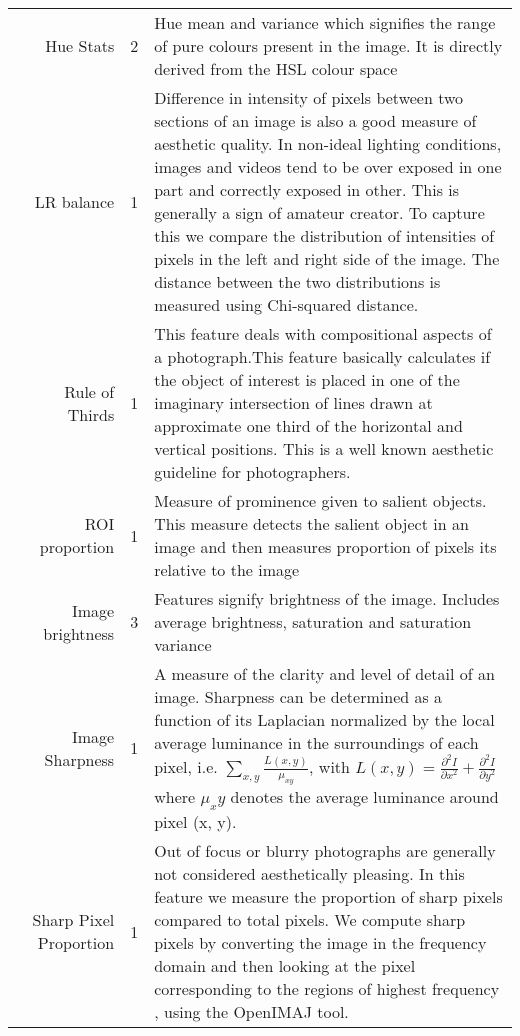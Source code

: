 \begin{appendix}
\begin{table}[hp]
{\begin{tabular}{|c|r|c|p{17cm}|}
		& Hue Stats & 2 & Hue mean and variance which signifies the range of pure colours present in the image. It is directly derived from the HSL colour space \\ %
		& LR balance &1 & Difference in intensity of pixels between two sections of an image is also a good measure of aesthetic quality. In non-ideal lighting conditions, images and videos tend to be over exposed in one part and correctly exposed in other. This is generally a sign of amateur creator. To capture this we compare the distribution of intensities of pixels in the left and right side of the image. The distance between the two distributions is measured using Chi-squared distance.\\
		& Rule of Thirds & 1 & This feature deals with compositional aspects of a photograph.This feature basically calculates if the object of interest is placed in one of the imaginary intersection of lines drawn at approximate one third of the horizontal and vertical positions. This is a well known aesthetic guideline for photographers. \\
		& ROI proportion & 1 & Measure of prominence given to salient objects. This measure detects the salient object in an image and then measures proportion of pixels its relative to the image \\
		& Image brightness & 3 & Features signify brightness of the image. Includes average brightness, saturation  and saturation variance\\
		& Image Sharpness & 1 & A measure of the clarity and level of detail of an image. Sharpness can be determined as a function of its Laplacian normalized by the local average luminance in the surroundings of each pixel, i.e. $\sum_{x, y} \frac{L(x, y)}{\mu_{xy}}$, with $L(x, y) = \frac{\partial^2I}{\partial x^2}+\frac{\partial^2I}{\partial y^2}$ where $\mu_xy$ denotes the average luminance around pixel (x, y).\\
		& Sharp Pixel Proportion  & 1 & Out of focus or blurry photographs are generally not considered aesthetically pleasing. In this feature we measure the proportion of sharp pixels compared to total pixels. We compute sharp pixels by converting the image in the frequency domain and then looking at the pixel corresponding to the regions of highest frequency \cite{yeh2010personalized}, using the OpenIMAJ \cite{Hare:2011:OIJ:2072298.2072421} tool.\\


\end{tabular}}
\end{table}
\end{appendix}
